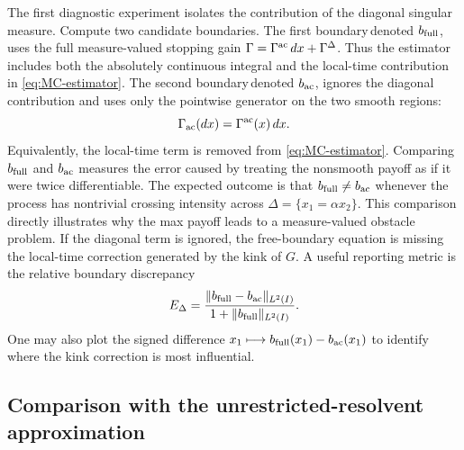 \documentclass[pdflatex,sn-mathphys-num]{sn-jnl}
\theoremstyle{plain}
\theoremstyle{definition}
\theoremstyle{remark}
\numberwithin{equation}{section}
\begin{document}
The first diagnostic experiment isolates the contribution of the diagonal singular measure. Compute two candidate boundaries. The first boundary\,denoted \(b_{\rm full}\), uses the full measure-valued stopping gain 
$\Gamma = \Gamma^{\rm ac}\,dx+\Gamma^\Delta $. 
Thus the estimator includes both the absolutely continuous integral and the local-time contribution in \eqref{eq:MC-estimator}. The second boundary\,denoted \(b_{\rm ac}\), ignores the diagonal contribution and uses only the pointwise generator on the two smooth regions: 
\[ 
\Gamma_{\rm ac}(dx)=\Gamma^{\rm ac}(x)\,dx . 
\] 
Equivalently, the local-time term is removed from \eqref{eq:MC-estimator}. Comparing \(b_{\rm full}\) and \(b_{\rm ac}\) measures the error caused by treating the nonsmooth payoff as if it were twice differentiable. The expected outcome is that 
$b_{\rm full}\neq b_{\rm ac} $
whenever the process has nontrivial crossing intensity across 
$\Delta=\{x_1=\alpha x_2\}$. 
This comparison directly illustrates why the max payoff leads to a measure-valued obstacle problem. If the diagonal term is ignored, the free-boundary equation is missing the local-time correction generated by the kink of \(G\). A useful reporting metric is the relative boundary discrepancy 
\begin{equation} \label{eq:diagonal-discrepancy} 
E_\Delta = \frac{ \|b_{\rm full}-b_{\rm ac}\|_{L^2(I)} }{ 1+\|b_{\rm full}\|_{L^2(I)} } . 
\end{equation} 
One may also plot the signed difference 
$x_1\longmapsto b_{\rm full}(x_1)-b_{\rm ac}(x_1)$ 
to identify where the kink correction is most influential. 

\subsection{Comparison with the unrestricted-resolvent approximation} \label{subsec:unrestricted-comparison} 
\end{document}
